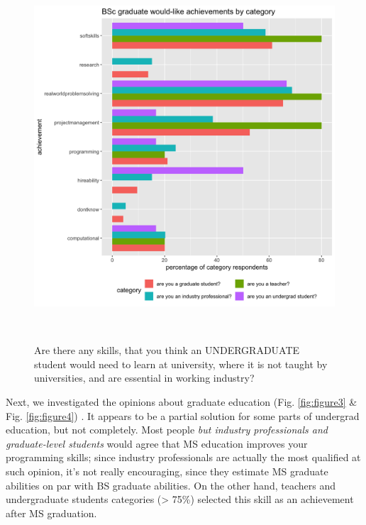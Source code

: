 \documentclass{sigchi}
\begin{document}
\begin{figure}
 \includegraphics[scale=0.2]{../data-analysis/plots_output/BSc_graduate_would-like_achievements_by_category.png}
  \caption{Are there any skills, that you think an UNDERGRADUATE student would need to learn at university, where it is not taught by universities, and are essential in working industry?}~\label{fig:figure2}
\end{figure}

Next, we investigated the opinions about graduate education (Fig.  \ref{fig:figure3} \& Fig.  \ref{fig:figure4}) . It appears to be a partial solution for some parts of undergrad education, but not completely. Most people \textit{but industry professionals and graduate-level students} would agree that MS education improves your programming skills; since industry professionals are actually the most qualified at such opinion, it's not really encouraging, since they estimate MS graduate abilities on par with BS graduate abilities. On the other hand, teachers and undergraduate students categories (> 75\%) selected this skill as an achievement after MS graduation.
\end{document}
